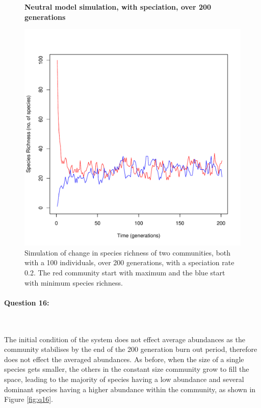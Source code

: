\documentclass{article}
\begin{document}
		\begin{figure}[H]
			\centering
			\textbf{Neutral model simulation, with speciation, over 200 generations}\par\medskip
		\includegraphics[width=0.8\linewidth]{../Results/time_series_speciation.pdf}
		\caption{Simulation of change in species richness of two communities, both with a 100 individuals, over 200 generations, with a speciation rate 0.2. The red community start with maximum and the blue start with minimum species richness.}
		\label{fig:q12}
	\end{figure}

\newpage

\paragraph{Question 16:}\

\noindent \newline The initial condition of the system does not effect average abundances as the community stabilises by the end of the 200 generation burn out period, therefore does not effect the averaged abundances. As before, when the size of a single species gets smaller, the others in the constant size community grow to fill the space, leading to the majority of species having a low abundance and several dominant species having a higher abundance within the community, as shown in Figure \ref{fig:q16}.  \newline
\end{document}
